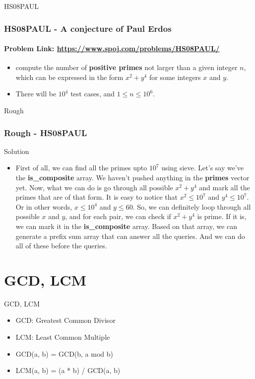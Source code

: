 \documentclass{beamer}
\begin{document}
\begin{frame}{HS08PAUL}
  \frametitle{HS08PAUL - A conjecture of Paul Erdos}
  \framesubtitle{Problem Link: \url{https://www.spoj.com/problems/HS08PAUL/}}
  \begin{itemize}
\item<1-> compute the number of \textbf{positive primes} not larger than a given integer \( n \), which can be expressed in the form \( x^2 + y^4 \) for some integers \( x \) and \( y \).
  \item<2-> There will be $10^4$ test cases, and $1 \leq n \leq 10^6$.
  \end{itemize}
\end{frame}

\begin{frame}{Rough}
  \frametitle{Rough - HS08PAUL}
\end{frame}
\begin{frame}{Solution}
  \begin{itemize}
    \item<1-> 
First of all, we can find all the primes upto $10^7$ using sieve. Let's say we've the \textbf{is\_composite} array. We haven't pushed anything in the \textbf{primes} vector yet. Now, what we can do is go through all possible $x^2+y^4$ and mark all the primes that are of that form. It is easy to notice that $x^2 \leq 10^7$ and $y^4 \leq 10^7$. Or in other words, $x \leq 10^4$ and $y \leq 60$. So, we can definitely loop through all possible $x$ and $y$, and for each pair, we can check if $x^2+y^4$ is prime. If it is, we can mark it in the \textbf{is\_composite} array. Based on that array, we can generate a prefix sum array that can answer all the queries. And we can do all of these before the queries. 
  \end{itemize}
\end{frame}
\section{GCD, LCM}
\begin{frame}{GCD, LCM}
  \begin{itemize}
    \item<1-> GCD: Greatest Common Divisor
    \item<2-> LCM: Least Common Multiple
    \item<3-> GCD(a, b) = GCD(b, a mod b)
    \item<4-> LCM(a, b) = (a * b) / GCD(a, b)
  \end{itemize}
\end{frame}
\end{document}
